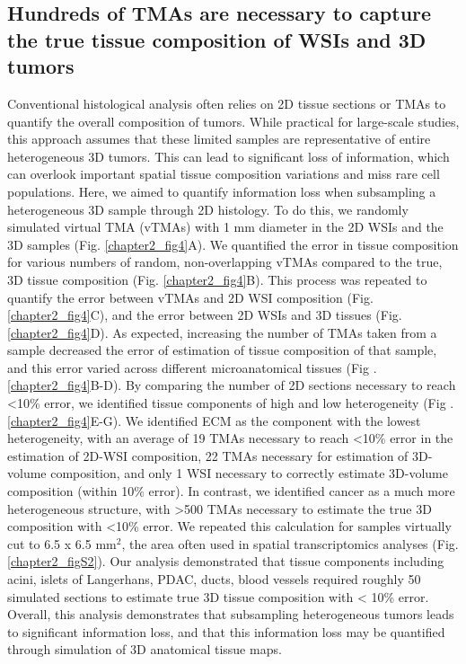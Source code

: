 \begin{refsection}
    \subsection{Hundreds of TMAs are necessary to capture the true tissue composition of WSIs and 3D tumors}
    Conventional histological analysis often relies on 2D tissue sections or TMAs to quantify the overall composition of tumors. While practical for large-scale studies, this approach assumes that these limited samples are representative of entire heterogeneous 3D tumors. This can lead to significant loss of information, which can overlook important spatial tissue composition variations and miss rare cell populations. Here, we aimed to quantify information loss when subsampling a heterogeneous 3D sample through 2D histology. To do this, we randomly simulated virtual TMA (vTMAs) with 1 mm diameter in the 2D WSIs and the 3D samples (Fig. \ref{chapter2_fig4}A). We quantified the error in tissue composition for various numbers of random, non-overlapping vTMAs compared to the true, 3D tissue composition (Fig. \ref{chapter2_fig4}B). This process was repeated to quantify the error between vTMAs and 2D WSI composition (Fig. \ref{chapter2_fig4}C), and the error between 2D WSIs and 3D tissues (Fig. \ref{chapter2_fig4}D). 
    As expected, increasing the number of TMAs taken from a sample decreased the error of estimation of tissue composition of that sample, and this error varied across different microanatomical tissues (Fig . \ref{chapter2_fig4}B-D). By comparing the number of 2D sections necessary to reach <10\% error, we identified tissue components of high and low heterogeneity (Fig . \ref{chapter2_fig4}E-G). We identified ECM as the component with the lowest heterogeneity, with an average of 19 TMAs necessary to reach <10\% error in the estimation of 2D-WSI composition, 22 TMAs necessary for estimation of 3D-volume composition, and only 1 WSI necessary to correctly estimate 3D-volume composition (within 10\% error). In contrast, we identified cancer as a much more heterogeneous structure, with >500 TMAs necessary to estimate the true 3D composition with <10\% error.
    We repeated this calculation for samples virtually cut to 6.5 x 6.5 mm$^2$, the area often used in spatial transcriptomics analyses (Fig. \ref{chapter2_figS2})\cite{Moncada2020Integrating,Johnson2023Digitize,He2020Integrating,Longo2021Integrating}. Our analysis demonstrated that tissue components including acini, islets of Langerhans, PDAC, ducts, blood vessels required roughly 50 simulated sections to estimate true 3D tissue composition with < 10\% error. Overall, this analysis demonstrates that subsampling heterogeneous tumors leads to significant information loss, and that this information loss may be quantified through simulation of 3D anatomical tissue maps.



\end{refsection}
